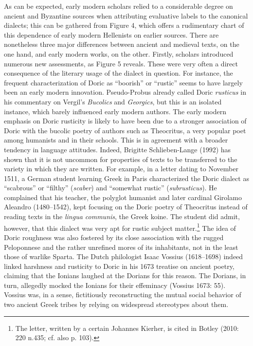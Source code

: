 \documentclass[12pt]{article}
\newenvironment{styleStandard}{\renewcommand\baselinestretch{1.25}\setlength\leftskip{0in}\setlength\rightskip{0in}\setlength\parindent{0.1972in}\setlength\parfillskip{0pt plus 1fil}\setlength\parskip{0in plus 1pt}\writerlistparindent\writerlistleftskip\leavevmode\normalfont\normalsize\writerlistlabel\ignorespaces}{\unskip\vspace{0in plus 1pt}\par}
\newcommand\writerlistleftskip{}
\newcommand\writerlistparindent{}
\newcommand\writerlistlabel{}
\newcounter{Figure}
\begin{document}
\begin{styleStandard}
As can be expected, early modern scholars relied to a considerable degree on ancient and Byzantine sources when attributing evaluative labels to the canonical dialects; this can be gathered from Figure 4, which offers a rudimentary chart of this dependence of early modern Hellenists on earlier sources. There are nonetheless three major differences between ancient and medieval texts, on the one hand, and early modern works, on the other. Firstly, scholars introduced numerous new assessments, as Figure 5 reveals. These were very often a direct consequence of the literary usage of the dialect in question. For instance, the frequent characterization of Doric as “boorish” or “rustic” seems to have largely been an early modern innovation. Pseudo-Probus already called Doric \textit{rusticus} in his commentary on Vergil’s \textit{Bucolics} and \textit{Georgics}, but this is an isolated instance, which barely influenced early modern authors. The early modern emphasis on Doric rusticity is likely to have been due to a stronger association of Doric with the bucolic poetry of authors such as Theocritus, a very popular poet among humanists and in their schools. This is in agreement with a broader tendency in language attitudes. Indeed, Brigitte Schlieben-Lange (1992) has shown that it is not uncommon for properties of texts to be transferred to the variety in which they are written. For example, in a letter dating to November 1511, a German student learning Greek in Paris characterized the Doric dialect as “scabrous” or “filthy” (\textit{scaber}) and “somewhat rustic” (\textit{subrusticus}). He complained that his teacher, the polyglot humanist and later cardinal Girolamo Aleandro (1480–1542), kept focusing on the Doric poetry of Theocritus instead of reading texts in the \textit{lingua communis}, the Greek koine. The student did admit, however, that this dialect was very apt for rustic subject matter.\footnote{ The letter, written by a certain Johannes Kierher, is cited in Botley (2010: 220 n.435; cf. also p. 103).} The idea of Doric roughness was also fostered by its close association with the rugged Peloponnese and the rather unrefined mores of its inhabitants, not in the least those of warlike Sparta. The Dutch philologist Isaac Vossius (1618–1698) indeed linked harshness and rusticity to Doric in his 1673 treatise on ancient poetry, claiming that the Ionians laughed at the Dorians for this reason. The Dorians, in turn, allegedly mocked the Ionians for their effeminacy (Vossius 1673: 55). Vossius was, in a sense, fictitiously reconstructing the mutual social behavior of two ancient Greek tribes by relying on widespread stereotypes about them.
\end{styleStandard}
\end{document}
